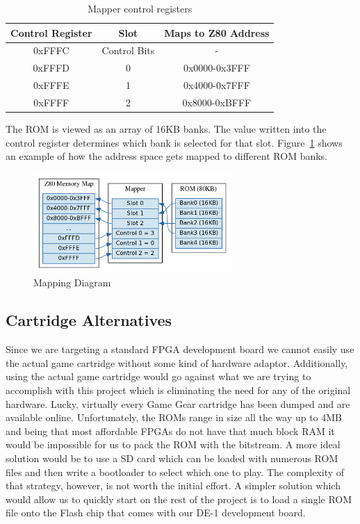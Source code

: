 \documentclass{article}
\begin{document}
\begin{table}[H]
    \centering
    \begin{tabular}{|c|c|c|}
        \hline
        \textbf{Control Register} & \textbf{Slot}     & \textbf{Maps to Z80 Address} \\ \hline
        0xFFFC           & Control Bits & -              \\ \hline
        0xFFFD           & 0            & 0x0000-0x3FFF  \\ \hline
        0xFFFE           & 1            & 0x4000-0x7FFF  \\ \hline
        0xFFFF           & 2            & 0x8000-0xBFFF  \\
        \hline
    \end{tabular}
    \caption{Mapper control registers \protect\cite{mapper}}
\end{table}
The ROM is viewed as an array of 16KB banks. The value written into 
the control register determines which bank is selected for 
that slot. Figure~\ref{fig:mapping_diagram} shows an example of
how the address space gets mapped to different ROM banks.
\begin{figure}[H]
\centering
\includegraphics[height=1.5in]{mapper.png}
\caption{Mapping Diagram}
\label{fig:mapping_diagram}
\end{figure}

\subsection{Cartridge Alternatives}
Since we are targeting a standard FPGA development board we cannot
easily use the actual game cartridge without some kind of hardware adaptor.
Additionally, using the actual game cartridge would go
against what we are trying to accomplish with this project which is
eliminating the need for any of the original hardware. Lucky, virtually
every Game Gear cartridge has been dumped and are available online.
Unfortunately, the ROMs range in size all the way up to 4MB and being that
most affordable FPGAs do not have that much block RAM it would be
impossible for us to pack the ROM with the bitstream. A more ideal
solution would be to use a SD card which can be loaded with numerous
ROM files and then write a bootloader to select which one to play.
The complexity of that strategy, however, is not worth the initial
effort. A simpler solution which would allow us to quickly start on the
rest of the project is to load a single ROM file onto the Flash chip
that comes with our DE-1 development board.
\end{document}
